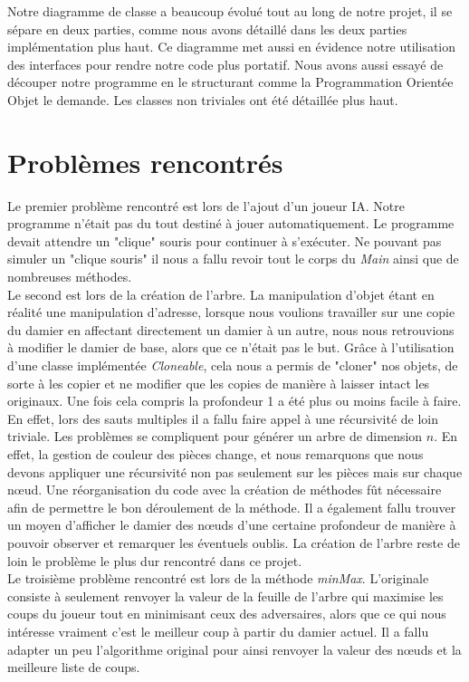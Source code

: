 \documentclass[12,french]{report}
\begin{document}
Notre diagramme de classe a beaucoup évolué tout au long de notre projet, il se sépare en deux parties, comme nous avons détaillé dans les deux parties implémentation plus haut.
Ce diagramme met aussi en évidence notre utilisation des interfaces pour rendre notre code plus portatif. Nous avons aussi essayé de découper notre programme en le structurant comme la Programmation Orientée Objet le demande. Les classes non triviales ont été détaillée plus haut.



\chapter{Problèmes rencontrés}

Le premier problème rencontré est lors de l'ajout d'un joueur IA. Notre programme n'était pas du tout destiné à jouer automatiquement. Le programme devait attendre un "clique" souris pour continuer à s'exécuter. Ne pouvant pas simuler un "clique souris" il nous a fallu revoir tout le corps du \textit{Main} ainsi que de nombreuses méthodes.\\

Le second est lors de la création de l'arbre. La manipulation d'objet étant en réalité une manipulation d'adresse, lorsque nous voulions travailler sur une copie du damier en affectant directement un damier à un autre, nous nous retrouvions à modifier le damier de base, alors que ce n'était pas le but. Grâce à l'utilisation d'une classe implémentée \textit{Cloneable}, cela nous a permis de "cloner" nos objets, de sorte à les copier et ne modifier que les copies de manière à laisser intact les originaux. Une fois cela compris la profondeur 1 a été plus ou moins facile à faire. En effet, lors des sauts multiples il a fallu faire appel à une récursivité de loin triviale. Les problèmes se compliquent pour générer un arbre de dimension $n$. En effet, la gestion de couleur des pièces change, et nous remarquons que nous devons appliquer une récursivité non pas seulement sur les pièces mais sur chaque nœud. Une réorganisation du code avec la création de méthodes fût nécessaire afin de permettre le bon déroulement de la méthode. Il a également fallu trouver un moyen d'afficher le damier des nœuds d'une certaine profondeur de manière à pouvoir observer et remarquer les éventuels oublis. La création de l'arbre reste de loin le problème le plus dur rencontré dans ce projet.\\

Le troisième problème rencontré est lors de la méthode \textit{minMax}. L'originale consiste à seulement renvoyer la valeur de la feuille de l'arbre qui maximise les coups du joueur tout en minimisant ceux des adversaires, alors que ce qui nous intéresse vraiment c'est le meilleur coup à partir du damier actuel. Il a fallu adapter un peu l'algorithme original pour ainsi renvoyer la valeur des nœuds et la meilleure liste de coups.\\
\end{document}
